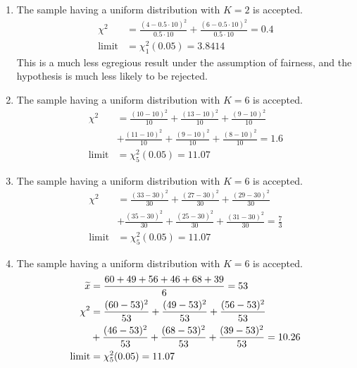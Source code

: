 \begin{enumerate}
    \item The sample having a uniform distribution with $ K = 2 $ is
          \textcolor{y_h}{accepted}.
          \begin{align}
              \chi^2       & = \frac{(4 - 0.5 \cdot 10)^2}{0.5 \cdot 10}
              + \frac{(6 - 0.5 \cdot 10)^2}{0.5 \cdot 10} = 0.4          \\
              \text{limit} & = \chi^2_{1}(0.05) = 3.8414
          \end{align}
          This is a much less egregious result under the assumption of fairness, and the
          hypothesis is much less likely to be rejected.

    \item The sample having a uniform distribution with $ K=6 $ is
          \textcolor{y_h}{accepted}.
          \begin{align}
              \chi^2       & = \frac{(10 - 10)^2}{10} + \frac{(13 - 10)^2}{10}
              + \frac{(9 - 10)^2}{10}                                          \\
                           & + \frac{(11 - 10)^2}{10} + \frac{(9 - 10)^2}{10}
              + \frac{(8 - 10)^2}{10} = 1.6                                    \\
              \text{limit} & = \chi^2_{5}(0.05) = 11.07
          \end{align}

    \item The sample having a uniform distribution with $ K=6 $ is
          \textcolor{y_h}{accepted}.
          \begin{align}
              \chi^2       & = \frac{(33 - 30)^2}{30} + \frac{(27 - 30)^2}{30}
              + \frac{(29 - 30)^2}{30}                                         \\
                           & + \frac{(35 - 30)^2}{30} + \frac{(25 - 30)^2}{30}
              + \frac{(31 - 30)^2}{30} = \frac{7}{3}                           \\
              \text{limit} & = \chi^2_{5}(0.05) = 11.07
          \end{align}

    \item The sample having a uniform distribution with
          $ K=6 $ is \textcolor{y_h}{accepted}.
          \begin{align}
              \widetilde{x}       & = \frac{60+49+56+46+68+39}{6} = 53                \\
              \chi^2       & = \frac{(60 - 53)^2}{53} + \frac{(49 - 53)^2}{53}
              + \frac{(56 - 53)^2}{53}                                         \\
                           & + \frac{(46 - 53)^2}{53} + \frac{(68 - 53)^2}{53}
              + \frac{(39 - 53)^2}{53} = 10.26                                 \\
              \text{limit} & = \chi^2_{5}(0.05) = 11.07
          \end{align}


\end{enumerate}
